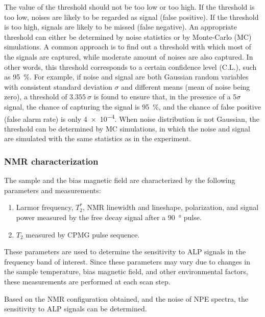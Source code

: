 The value of the threshold should not be too low or too high. 
If the threshold is too low, noises are likely to be regarded as signal (false positive). 
If the threshold is too high, signals are likely to be missed (false negative).
An appropriate threshold can either be determined by noise statistics or by Monte-Carlo (MC) simulations. 
A common approach is to find out a threshold with which most of the signals are captured, while moderate amount of noises are also captured. 
In other words, this threshold corresponds to a certain confidence level (C.L.), such as \SI{95}{\percent}. 
For example, if noise and signal are both Gaussian random variables with consistent standard deviation $\sigma$ and different means (mean of noise being zero), a threshold of $\SI{3.355}{\sigma}$ is found to ensure that, in the presence of a $5\sigma$ signal, the chance of capturing the signal is \SI{95}{\percent}, and the chance of false positive (false alarm rate) is only \SI{4e-4}{}. 
When noise distribution is not Gaussian, the threshold can be determined by MC simulations, in which the noise and signal are simulated with the same statistics as in the experiment. 

\subsubsection{NMR characterization}

The sample and the bias magnetic field are characterized by the following parameters and measurements:
\begin{enumerate}[label=\arabic*.]
    \item Larmor frequency, $T_2^*$, NMR linewidth and lineshape, polarization, and signal power measured by the free decay signal after a \SI{90}{\degree} pulse. 
    \item $T_2$ measured by CPMG pulse sequence. 
\end{enumerate}
These parameters are used to determine the sensitivity to ALP signals in the frequency band of interest.
Since these parameters may vary due to changes in the sample temperature, bias magnetic field, and other environmental factors, these measurements are performed at each scan step. 

Based on the NMR configuration obtained, and the noise of NPE spectra, the sensitivity to ALP signals can be determined. 


